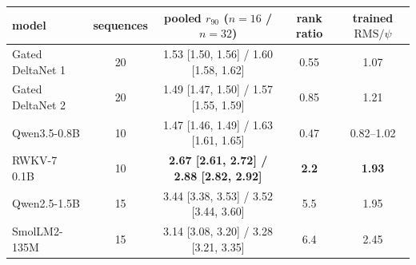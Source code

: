 \begin{tabular}{lcccc}
\toprule
model & sequences & pooled $r_{90}$ ($n=16$ / $n=32$) & rank ratio & trained $\mathrm{RMS}/\psi$ \\
\midrule
Gated DeltaNet 1 & 20 & 1.53 [1.50, 1.56] / 1.60 [1.58, 1.62] & 0.55 & 1.07 \\
Gated DeltaNet 2 & 20 & 1.49 [1.47, 1.50] / 1.57 [1.55, 1.59] & 0.85 & 1.21 \\
Qwen3.5-0.8B & 10 & 1.47 [1.46, 1.49] / 1.63 [1.61, 1.65] & 0.47 & 0.82--1.02 \\
RWKV-7 0.1B & 10 & \textbf{2.67 [2.61, 2.72] / 2.88 [2.82, 2.92]} & \textbf{2.2} & \textbf{1.93} \\
Qwen2.5-1.5B & 15 & 3.44 [3.38, 3.53] / 3.52 [3.44, 3.60] & 5.5 & 1.95 \\
SmolLM2-135M & 15 & 3.14 [3.08, 3.20] / 3.28 [3.21, 3.35] & 6.4 & 2.45 \\
\bottomrule
\end{tabular}

